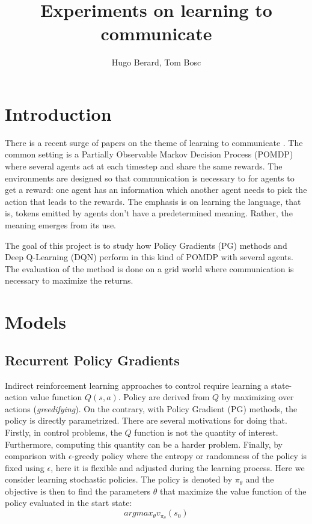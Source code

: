 \documentclass{article} %
\title{Experiments on learning to communicate}
\author{
Hugo Berard, Tom Bosc
}
\begin{document}
\maketitle

\section{Introduction}
There is a recent surge of papers on the theme of learning to communicate \cite{sukhbaatar2016learning} \cite{foerster2016learning} \cite{lazaridou2016multi} \cite{mordatch2017emergence}. The common setting is a Partially Observable Markov Decision Process (POMDP) where several agents act at each timestep and share the same rewards. The environments are designed so that communication is necessary to for agents to get a reward: one agent has an information which another agent needs to pick the action that leads to the rewards. The emphasis is on learning the language, that is, tokens emitted by agents don't have a predetermined meaning. Rather, the meaning emerges from its use.

The goal of this project is to study how Policy Gradients (PG) methods and Deep Q-Learning (DQN) perform in this kind of POMDP with several agents. The evaluation of the method is done on a grid world where communication is necessary to maximize the returns.

\section{Models}
\subsection{Recurrent Policy Gradients}
Indirect reinforcement learning approaches to control require learning a state-action value function $Q(s,a)$. Policy are derived from $Q$ by maximizing over actions (\textit{greedifying}). On the contrary, with Policy Gradient (PG) methods, the policy is directly parametrized. There are several motivations for doing that\cite{sutton1998reinforcement}. Firstly, in control problems, the $Q$ function is not the quantity of interest. Furthermore, computing this quantity can be a harder problem. Finally, by comparison with $\epsilon$-greedy policy where the entropy or randomness of the policy is fixed using $\epsilon$, here it is flexible and adjusted during the learning process. Here we consider learning stochastic policies. The policy is denoted by $\pi_{\theta}$ and the objective is then to find the parameters $\theta$ that maximize the value function of the policy evaluated in the start state:
$$
argmax_{\theta} v_{\pi_{\theta}}(s_0)
$$
\end{document}
